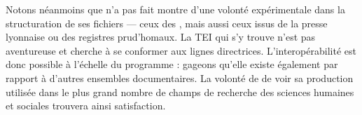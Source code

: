 Notons néanmoins que \timeus{} n'a pas fait montre d'une volonté expérimentale dans la structuration de ses fichiers --- ceux des \odm, mais aussi ceux issus de la presse lyonnaise ou des registres prud'homaux. La TEI qui s'y trouve n'est pas aventureuse et cherche à se conformer aux lignes directrices. L'interopérabilité est donc possible à l'échelle du programme : gageons qu'elle existe également par rapport à d'autres ensembles documentaires. La volonté de \timeus{} de voir sa production utilisée dans le plus grand nombre de champs de recherche des sciences humaines et sociales trouvera ainsi satisfaction.

\newpage
\thispagestyle{empty}
\mbox{}
\newpage
